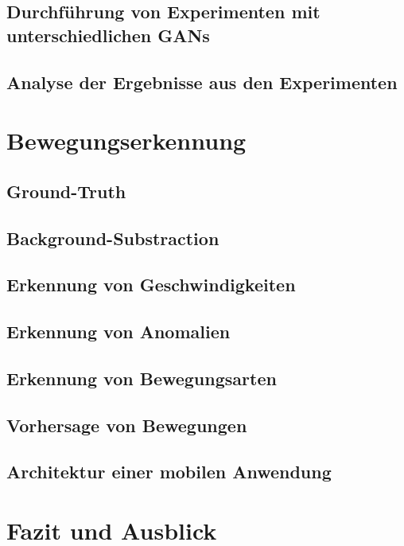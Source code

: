 \documentclass{hsflensburg}
\begin{document}
  \section{Durchführung von Experimenten mit unterschiedlichen GANs}
  \section{Analyse der Ergebnisse aus den Experimenten}

  \chapter{Bewegungserkennung}
  \section{Ground-Truth}
  \section{Background-Substraction}
  \section{Erkennung von Geschwindigkeiten}
  \section{Erkennung von Anomalien}
  \section{Erkennung von Bewegungsarten}
  \section{Vorhersage von Bewegungen}
  \section{Architektur einer mobilen Anwendung}

  \chapter{Fazit und Ausblick}

  \printbibliography
\end{document}
